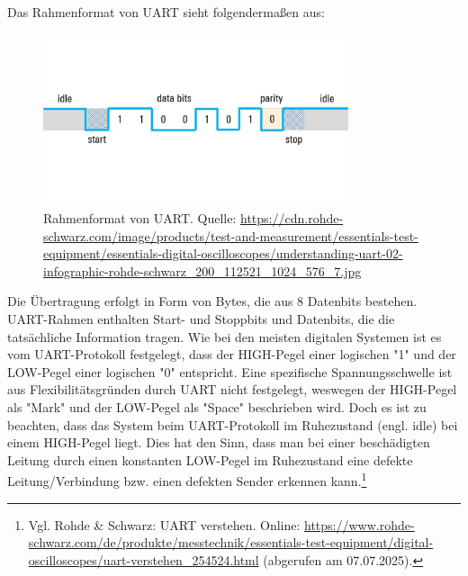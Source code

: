 Das Rahmenformat von UART sieht folgendermaßen aus:
\begin{figure}[H]
    \centering
    \includegraphics[width=0.8\textwidth]{Pictures/UART-Frame.jpg}
    \caption{Rahmenformat von UART. Quelle: \url{https://cdn.rohde-schwarz.com/image/products/test-and-measurement/essentials-test-equipment/essentials-digital-oscilloscopes/understanding-uart-02-infographic-rohde-schwarz_200_112521_1024_576_7.jpg}}
    \label{fig:UART-Frame}
\end{figure}

Die Übertragung erfolgt in Form von Bytes, die aus 8 Datenbits bestehen. UART-Rahmen enthalten Start- und Stoppbits und Datenbits, die die tatsächliche Information tragen. Wie bei den meisten digitalen Systemen ist es vom UART-Protokoll festgelegt, dass der HIGH-Pegel einer logischen "1" und der LOW-Pegel einer logischen "0" entspricht. Eine spezifische Spannungsschwelle ist aus Flexibilitätsgründen durch UART nicht festgelegt, weswegen der HIGH-Pegel als "Mark" und der LOW-Pegel als "Space" beschrieben wird. Doch es ist zu beachten, dass das System beim UART-Protokoll im Ruhezustand (engl. idle) bei einem HIGH-Pegel liegt. Dies hat den Sinn, dass man bei einer beschädigten Leitung durch einen konstanten LOW-Pegel im Ruhezustand eine defekte Leitung/Verbindung bzw. einen defekten Sender erkennen kann.\footnote{Vgl. Rohde \& Schwarz: UART verstehen. Online: \url{https://www.rohde-schwarz.com/de/produkte/messtechnik/essentials-test-equipment/digital-oscilloscopes/uart-verstehen_254524.html} (abgerufen am 07.07.2025).}

